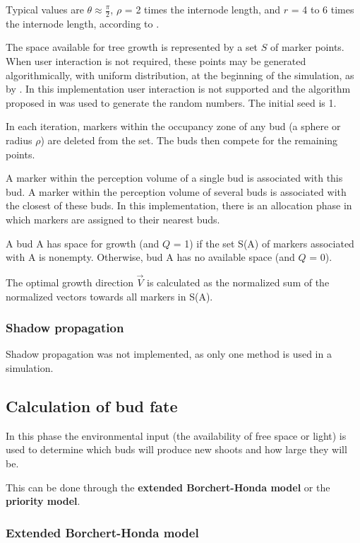 \documentclass{article}
\begin{document}
Typical values are \(\theta \approx \frac{\pi}{2}\), \(\rho\) = 2 times the internode length, and \(r\) = 4 to 6 times the internode length, according to \cite[p. 3]{Palubicki2009}.

The space available for tree growth is represented by a set \(S\) of marker points.
When user interaction is not required, these points may be generated algorithmically, with uniform distribution, at the beginning of the simulation, as by \cite[p. 3]{Palubicki2009}.
In this implementation user interaction is not supported and the algorithm proposed in \cite{Steele2014} was used to generate the random numbers. The initial seed is 1.

In each iteration, markers within the occupancy zone of any bud (a sphere or radius \(\rho\)) are deleted from the set.
The buds then compete for the remaining points.

A marker within the perception volume of a single bud is associated with this bud. A marker within the perception volume of several buds is associated with the closest of these buds.
In this implementation, there is an allocation phase in which markers are assigned to their nearest buds.

A bud A has space for growth (and \(Q\) = 1) if the set S(A) of markers associated with A is nonempty. Otherwise, bud A has no available space (and \(Q\) = 0).

The optimal growth direction \(\vec{V}\) is calculated as the normalized sum of the normalized vectors towards all markers in S(A).

\subsubsection{Shadow propagation}

Shadow propagation was not implemented, as only one method is used in a simulation.

\subsection{Calculation of bud fate}

In this phase the environmental input (the availability of free space or light) is used to determine which buds will produce new shoots and how large they will be.

This can be done through the \textbf{extended Borchert-Honda model} or the \textbf{priority model}.

\subsubsection{Extended Borchert-Honda model}
\end{document}
